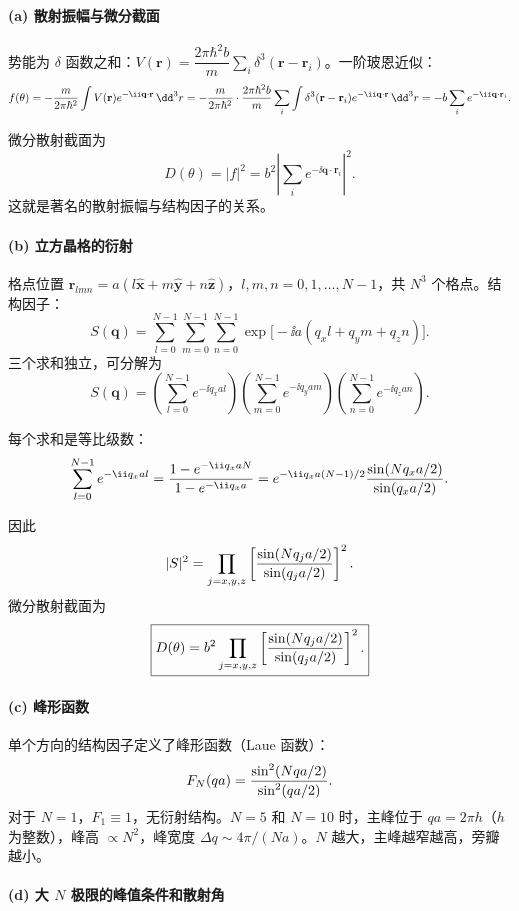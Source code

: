 \begin{solution}
\paragraph{(a) 散射振幅与微分截面}

势能为 $\delta$ 函数之和：$V(\mathbf r)=\dfrac{2\pi\hbar^2 b}{m}\sum_i\delta^3(\mathbf r-\mathbf r_i)$。一阶玻恩近似：
\[
f(\theta)=-{m\over2\pi\hbar^2}\int V(\mathbf r)e^{-\ii\mathbf q\cdot\mathbf r}\,\dd^3r
=-{m\over2\pi\hbar^2}\cdot{2\pi\hbar^2 b\over m}\sum_i\int\delta^3(\mathbf r-\mathbf r_i)e^{-\ii\mathbf q\cdot\mathbf r}\,\dd^3r
=-b\sum_i e^{-\ii\mathbf q\cdot\mathbf r_i}.
\]

微分散射截面为
\[
\boxed{D(\theta)=|f|^2=b^2\left|\sum_i e^{-\ii\mathbf q\cdot\mathbf r_i}\right|^2.}
\]
这就是著名的散射振幅与结构因子的关系。

\paragraph{(b) 立方晶格的衍射}

格点位置 $\mathbf r_{lmn}=a(l\hat{\mathbf x}+m\hat{\mathbf y}+n\hat{\mathbf z})$，$l,m,n=0,1,\ldots,N-1$，共 $N^3$ 个格点。结构因子：
\[
S(\mathbf q)=\sum_{l=0}^{N-1}\sum_{m=0}^{N-1}\sum_{n=0}^{N-1}
\exp\bigl[-\ii a(q_x l+q_y m+q_z n)\bigr].
\]
三个求和独立，可分解为
\[
S(\mathbf q)=\left(\sum_{l=0}^{N-1}e^{-\ii q_x a l}\right)
\left(\sum_{m=0}^{N-1}e^{-\ii q_y a m}\right)
\left(\sum_{n=0}^{N-1}e^{-\ii q_z a n}\right).
\]

每个求和是等比级数：
\[
\sum_{l=0}^{N-1}e^{-\ii q_x a l}
={1-e^{-\ii q_x a N}\over1-e^{-\ii q_x a}}
=e^{-\ii q_x a(N-1)/2}{\sin(N q_x a/2)\over\sin(q_x a/2)}.
\]

因此
\[
|S|^2=\prod_{j=x,y,z}\left[{\sin(N q_j a/2)\over\sin(q_j a/2)}\right]^2.
\]
微分散射截面为
\[
\boxed{D(\theta)=b^2\prod_{j=x,y,z}\left[{\sin(N q_j a/2)\over\sin(q_j a/2)}\right]^2.}
\]

\paragraph{(c) 峰形函数}

单个方向的结构因子定义了峰形函数（Laue 函数）：
\[
F_N(q a)={\sin^2(N q a/2)\over\sin^2(q a/2)}.
\]
对于 $N=1$，$F_1\equiv1$，无衍射结构。$N=5$ 和 $N=10$ 时，主峰位于 $qa=2\pi h$（$h$ 为整数），峰高 $\propto N^2$，峰宽度 $\Delta q\sim 4\pi/(Na)$。$N$ 越大，主峰越窄越高，旁瓣越小。

\paragraph{(d) 大 $N$ 极限的峰值条件和散射角}


\end{solution}
